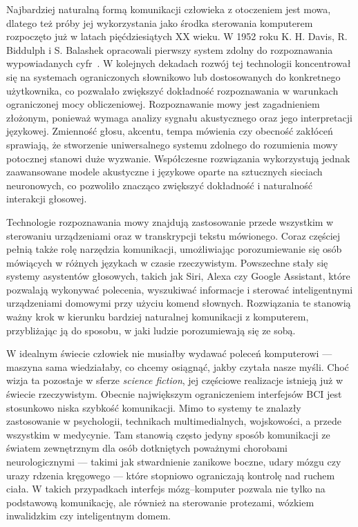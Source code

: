 Najbardziej naturalną formą komunikacji człowieka z otoczeniem jest mowa, dlatego też próby jej wykorzystania jako środka sterowania komputerem rozpoczęto już w latach pięćdziesiątych XX wieku. W 1952 roku K. H. Davis, R. Biddulph i S. Balashek opracowali pierwszy system zdolny do rozpoznawania wypowiadanych cyfr~\cite{davis1952}. W kolejnych dekadach rozwój tej technologii koncentrował się na systemach ograniczonych słownikowo lub dostosowanych do konkretnego użytkownika, co pozwalało zwiększyć dokładność rozpoznawania w warunkach ograniczonej mocy obliczeniowej. Rozpoznawanie mowy jest zagadnieniem złożonym, ponieważ wymaga analizy sygnału akustycznego oraz jego interpretacji językowej. Zmienność głosu, akcentu, tempa mówienia czy obecność zakłóceń sprawiają, że stworzenie uniwersalnego systemu zdolnego do rozumienia mowy potocznej stanowi duże wyzwanie. Współczesne rozwiązania wykorzystują jednak zaawansowane modele akustyczne i językowe oparte na sztucznych sieciach neuronowych, co pozwoliło znacząco zwiększyć dokładność i naturalność interakcji głosowej.

Technologie rozpoznawania mowy znajdują zastosowanie przede wszystkim w sterowaniu urządzeniami oraz w transkrypcji tekstu mówionego. Coraz częściej pełnią także rolę narzędzia komunikacji, umożliwiając porozumiewanie się osób mówiących w różnych językach w czasie rzeczywistym. Powszechne stały się systemy asystentów głosowych, takich jak Siri, Alexa czy Google Assistant, które pozwalają wykonywać polecenia, wyszukiwać informacje i sterować inteligentnymi urządzeniami domowymi przy użyciu komend słownych. Rozwiązania te stanowią ważny krok w kierunku bardziej naturalnej komunikacji z komputerem, przybliżając ją do sposobu, w jaki ludzie porozumiewają się ze sobą.

W idealnym świecie człowiek nie musiałby wydawać poleceń komputerowi --- maszyna sama wiedziałaby, co chcemy osiągnąć, jakby czytała nasze myśli. Choć wizja ta pozostaje w sferze \textit{science fiction}, jej częściowe realizacje istnieją już w świecie rzeczywistym. Obecnie największym ograniczeniem interfejsów BCI jest stosunkowo niska szybkość komunikacji. Mimo to systemy te znalazły zastosowanie w psychologii, technikach multimedialnych, wojskowości, a przede wszystkim w medycynie. Tam stanowią często jedyny sposób komunikacji ze światem zewnętrznym dla osób dotkniętych poważnymi chorobami neurologicznymi --- takimi jak stwardnienie zanikowe boczne, udary mózgu czy urazy rdzenia kręgowego --- które stopniowo ograniczają kontrolę nad ruchem ciała. W takich przypadkach interfejs mózg--komputer pozwala nie tylko na podstawową komunikację, ale również na sterowanie protezami, wózkiem inwalidzkim czy inteligentnym domem.

